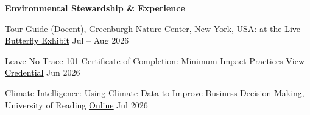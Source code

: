 \textbf{Environmental Stewardship \& Experience}
\begin{zitemize}
\item Tour Guide (Docent), Greenburgh Nature Center, New York, USA: at the {\href{https://naturecentergb.org/live-butterfly-exhibit/}{\underline{\textcolor{black}{Live Butterfly Exhibit}}}}
\hfill Jul -- Aug 2026
\item Leave No Trace 101 Certificate of Completion: Minimum-Impact Practices {\href{https://learn.lnt.org/certificates/f7isvbgpwa}{\underline{\textcolor{black}{View Credential}}}} \hfill Jun 2026
\item 
Climate Intelligence: Using Climate Data to Improve Business Decision-Making, University of Reading 
{\href{https://www.futurelearn.com/certificates/u0altta}{\underline{\textcolor{black}{Online}}}} 
\hfill Jul 2026
\end{zitemize}